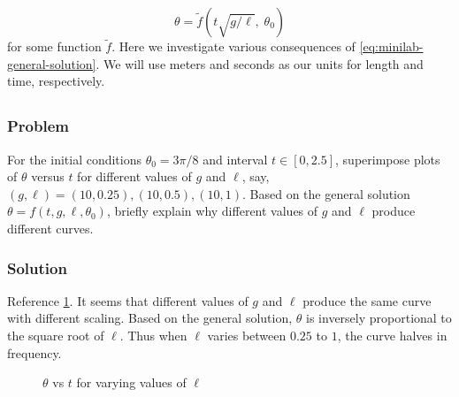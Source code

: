 \documentclass[12pt]{article}
\begin{document}
\begin{equation}
  \label{eq:minilab-general-solution}
  \theta = \tilde{f}(t\sqrt{g/\ell}, \;\theta_0)
\end{equation}
for some function $\tilde{f}$. Here we investigate various consequences of
\cref{eq:minilab-general-solution}. We will use meters and seconds as our units
for length and time, respectively.

\subsection{}
\label{sec:minilab-part-1}
  \subsubsection*{Problem}
  For the initial conditions $\theta_0=3\pi/8$ and interval $t\in[0,2.5]$,
  superimpose plots of $\theta$ versus $t$ for different values of $g$ and $\ell$,
  say, $(g,\ell)=(10, 0.25), (10, 0.5), (10, 1)$. Based on the general solution
  $\theta = f(t,g,\ell,\theta_0)$, briefly explain why different values of $g$ and
  $\ell$ produce different curves.

  \subsubsection*{Solution}
  Reference \cref{fig:minilab-part-1-solution}. It seems that different values of $g$ and
  $\ell$ produce the same curve with different scaling. Based on the general
  solution, $\theta$ is inversely proportional to the square root of $\ell$.
  Thus when $\ell$ varies between $0.25$ to $1$, the curve halves in frequency.

  \begin{figure}
    \centering
    \caption{$\theta$ vs $t$ for varying values of $\ell$}
\label{fig:minilab-part-1-solution}
  \end{figure}

\subsection{}
\label{sec:minilab-part-2}
\end{document}
